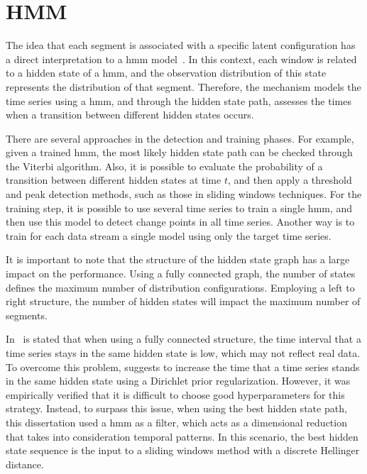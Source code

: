 \section{HMM}

The idea that each segment is associated with a specific latent configuration
has a direct interpretation to a \gls*{hmm}
model~\cite{a_hidden_markov_model_segmentation_procedure_for_hydrological_and_environmental_time_series, fast_estimation_of_posterior_probabilities_in_change-point_analysis_through_a_constrained_hidden_markov_model, inertial_hidden_markov_models_modeling_change_in_multivariate_time_series}.
In this context, each window is related to a hidden state of a \gls*{hmm}, and the
observation distribution of this state represents the distribution of that
segment. Therefore, the mechanism models the time series using a \gls*{hmm}, and
through the hidden state path, assesses the times when a transition between
different hidden states occurs.

There are several approaches in the detection and training phases. For example,
given a trained \gls*{hmm}, the most likely hidden state path can be checked
through
the Viterbi algorithm. Also, it is possible to evaluate the probability of a
transition between different hidden states at time $t$, and then apply a
threshold and peak detection methods, such as those in sliding windows techniques.
For the training step, it is possible to use several time series to train a
single \gls*{hmm}, and then use this model to detect change points in all time series.
Another way is to train for each data stream a single model using only the
target time series.

It is important to note that the structure of the hidden state graph has a large
impact on the performance. Using a fully connected graph, the number of states
defines the maximum number of distribution configurations. Employing a left to
right structure, the number of hidden states will impact the maximum number of
segments.

In~\cite{inertial_hidden_markov_models_modeling_change_in_multivariate_time_series}
is stated that when using a fully connected structure, the time interval that a
time series stays in the same hidden state is low, which may not reflect real
data. To overcome this problem,
\cite{inertial_hidden_markov_models_modeling_change_in_multivariate_time_series}
suggests to increase the time that a time series stands in the same hidden
state using a Dirichlet prior regularization. However, it was empirically
verified that it is difficult to choose good hyperparameters for this strategy.
Instead, to surpass this issue,
when using the best hidden state path, this dissertation used a \gls*{hmm} as a
filter, which acts as a dimensional reduction that takes into consideration
temporal
patterns. In this scenario, the best hidden state sequence is the input to
a sliding windows method with a discrete Hellinger distance.

